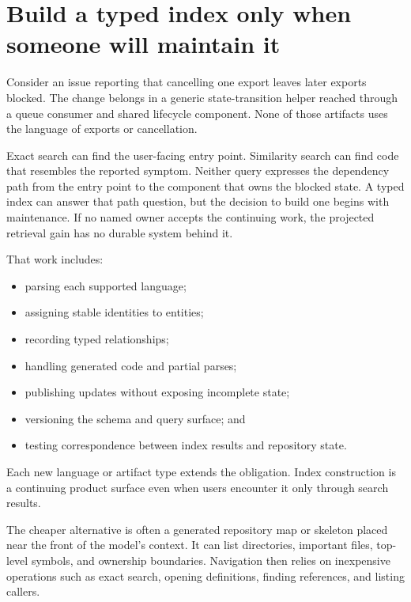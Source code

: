 \hypertarget{build-a-typed-index-only-when-someone-will-maintain-it}{%
\section{Build a typed index only when someone will maintain it}\label{build-a-typed-index-only-when-someone-will-maintain-it}}

Consider an issue reporting that cancelling one export leaves later exports blocked. The change belongs in a generic state-transition helper reached through a queue consumer and shared lifecycle component. None of those artifacts uses the language of exports or cancellation.

Exact search can find the user-facing entry point. Similarity search can find code that resembles the reported symptom. Neither query expresses the dependency path from the entry point to the component that owns the blocked state. A typed index can answer that path question, but the decision to build one begins with maintenance. If no named owner accepts the continuing work, the projected retrieval gain has no durable system behind it.


That work includes:

\begin{itemize}
\tightlist
\item
  parsing each supported language;
\item
  assigning stable identities to entities;
\item
  recording typed relationships;
\item
  handling generated code and partial parses;
\item
  publishing updates without exposing incomplete state;
\item
  versioning the schema and query surface; and
\item
  testing correspondence between index results and repository state.
\end{itemize}

Each new language or artifact type extends the obligation. Index construction is a continuing product surface even when users encounter it only through search results.

The cheaper alternative is often a generated repository map or skeleton placed near the front of the model's context. It can list directories, important files, top-level symbols, and ownership boundaries. Navigation then relies on inexpensive operations such as exact search, opening definitions, finding references, and listing callers.

